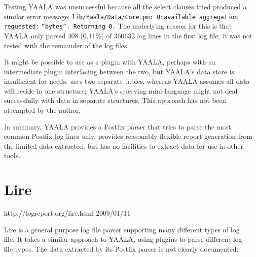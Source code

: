 Testing YAALA was unsuccessful because all the select clauses tried
produced a similar error message:
\newline{}\tab{}\texttt{lib/Yaala/Data/Core.pm: Unavailable aggregation
requested:} \newline{}\tab{}\tab{}\texttt{``bytes''.  Returning 0.}
\newline{}  The underlying reason for this is that YAALA only parsed 408
(0.11\%) of 360632 log lines in the first log file; it was not tested with
the remainder of the \numberOFlogFILES{} log files.

It might be possible to use \parsername{} as a plugin with YAALA, perhaps
with an intermediate plugin interfacing between the two, but YAALA's data
store is insufficient for \parsernames{} needs: \parsername{} uses two
separate tables, whereas YAALA assumes all data will reside in one
structure; YAALA's querying mini-language might not deal successfully with
data in separate structures.  This approach has not been attempted by the
author.

In summary, YAALA provides a Postfix parser that tries to parse the most
common Postfix log lines only, provides reasonably flexible report
generation from the limited data extracted, but has no facilities to
extract data for use in other tools.

\section{Lire}

\sloppy{}%
{http://logreport.org/lire.html}
{2009/01/11}
\fussy{}

Lire is a general purpose log file parser supporting many different types
of log file.  It takes a similar approach to YAALA, using plugins to parse
different log file types.  The data extracted by its Postfix parser is not
clearly documented:

